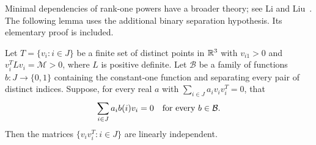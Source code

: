 Minimal dependencies of rank-one powers have a broader theory; see
Li and Liu~\cite{LiLiu}. The following lemma uses the additional binary
separation hypothesis. Its elementary proof is included.
\begin{lemma}\label{binary}
Let $T=\{v_i:i\in J\}$ be a finite set of distinct points in $\mathbb R^3$ with
$v_{i1}>0$ and $v_i^TLv_i=\mathcal M>0$, where $L$ is positive definite.
Let $\mathcal B$ be a family of functions $b:J\to\{0,1\}$ containing the
constant-one function and separating every pair of distinct indices.
Suppose, for every real $a$ with $\sum_{i\in J}a_iv_iv_i^T=0$, that
\begin{equation}
 \sum_{i\in J}a_i b(i)v_i=0\quad\hbox{for every }b\in\mathcal B. \label{obs}
\end{equation}
Then the matrices $\{v_iv_i^T:i\in J\}$ are linearly independent.
\end{lemma}

